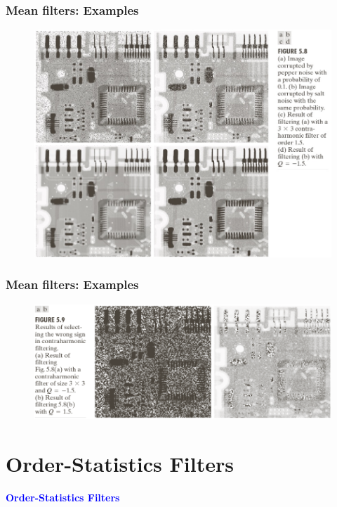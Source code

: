 \documentclass[english,11pt,table,handout]{beamer}
\begin{document}
\frame
{
	\frametitle{Mean filters: Examples }
	\begin{figure}[!h]
		\includegraphics[scale=0.65]{contraharmonic_1.png}
	\end{figure}
	
}
\frame
{
	\frametitle{Mean filters: Examples }
	\begin{figure}[!h]
		\includegraphics[scale=0.65]{contraharmonic_2.png}
	\end{figure}
	
}

\section{Order-Statistics Filters}
\frame
{
	\Huge
	\begin{center}
		\textcolor{blue}{\textbf{Order-Statistics Filters}}
	\end{center}
}
\end{document}
